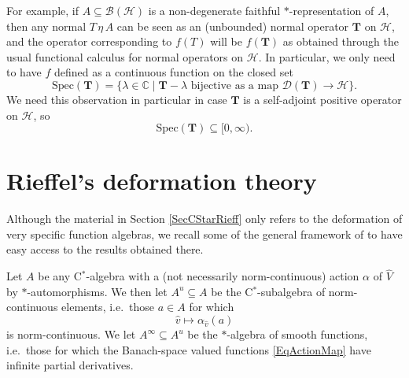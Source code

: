 \documentclass[11pt, reqno]{amsart}
\theoremstyle{definition}
\numberwithin{equation}{section}
\def\C{\mathbb C}
\def\msD{\mathscr D}
\newcommand{\Hsp}{\mathcal{H}}
\newcommand{\Bc}{\mathcal{B}}
\newcommand{\Spec}{\mathrm{Spec}}
\newcommand{\Tb}{\mathbf{T}}
\begin{document}
For example, if $A \subseteq \Bc(\Hsp)$ is a non-degenerate faithful $*$-representation of $A$, then any normal $T \,\eta\, A$ can be seen as an (unbounded) normal operator $\Tb$ on $\Hsp$, and the operator corresponding to $f(T)$ will be $f(\Tb)$ as obtained through the usual functional calculus for normal operators on $\Hsp$. In particular, we only need to have $f$ defined as a continuous function on the closed set 
\[
\Spec(\Tb) = \{\lambda \in \C \mid \Tb- \lambda \textrm{ bijective as a map }\msD(\Tb) \rightarrow \Hsp\}. 
\]
We need this observation in particular in case $\Tb$ is a self-adjoint positive operator on $\Hsp$, so
\[
\Spec(\Tb) \subseteq [0,\infty).
\]





\section{Rieffel's deformation theory}\label{SecRieff}

Although the material in Section \ref{SecCStarRieff} only refers to the deformation of very specific function algebras, we recall some of the general framework of  \cite{Rie93} to have easy access to the results obtained there. 

Let $A$ be any C$^*$-algebra with a (not necessarily norm-continuous) action $\alpha$ of $\hat{V}$ by $*$-automorphisms. We then let $A  ^u \subseteq A$ be the C$^*$-subalgebra of norm-continuous elements, i.e.\ those $a\in A$ for which 
\begin{equation}\label{EqActionMap}
\hat{v}\mapsto \alpha_{\hat{v}}(a)
\end{equation}
is norm-continuous. We let $A^{\infty} \subseteq A^u$ be the $*$-algebra of smooth functions, i.e.\ those for which the Banach-space valued functions \eqref{EqActionMap} have infinite partial derivatives.
\end{document}
